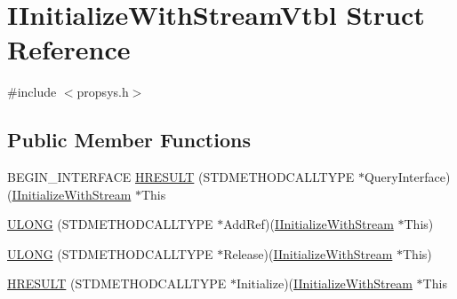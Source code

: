 \hypertarget{struct_i_initialize_with_stream_vtbl}{}\section{I\+Initialize\+With\+Stream\+Vtbl Struct Reference}
\label{struct_i_initialize_with_stream_vtbl}


{\ttfamily \#include $<$propsys.\+h$>$}

\subsection*{Public Member Functions}
\begin{DoxyCompactItemize}
\item 
B\+E\+G\+I\+N\+\_\+\+I\+N\+T\+E\+R\+F\+A\+CE \hyperlink{struct_i_initialize_with_stream_vtbl_afa1b5c7a34b7a6cb92bd225a3a9c5fe3}{H\+R\+E\+S\+U\+LT} (S\+T\+D\+M\+E\+T\+H\+O\+D\+C\+A\+L\+L\+T\+Y\+PE $\ast$Query\+Interface)(\hyperlink{propsys_8h_aa1202ac12c835e0b8b05d525e38b509e}{I\+Initialize\+With\+Stream} $\ast$This
\item 
\hyperlink{struct_i_initialize_with_stream_vtbl_a63333adfdb02b4011967942899cc5d77}{U\+L\+O\+NG} (S\+T\+D\+M\+E\+T\+H\+O\+D\+C\+A\+L\+L\+T\+Y\+PE $\ast$Add\+Ref)(\hyperlink{propsys_8h_aa1202ac12c835e0b8b05d525e38b509e}{I\+Initialize\+With\+Stream} $\ast$This)
\item 
\hyperlink{struct_i_initialize_with_stream_vtbl_ac90760ffc0e829818e0cff96502c1e6e}{U\+L\+O\+NG} (S\+T\+D\+M\+E\+T\+H\+O\+D\+C\+A\+L\+L\+T\+Y\+PE $\ast$Release)(\hyperlink{propsys_8h_aa1202ac12c835e0b8b05d525e38b509e}{I\+Initialize\+With\+Stream} $\ast$This)
\item 
\hyperlink{struct_i_initialize_with_stream_vtbl_af7e9da25d8ed3841d24a4c4787366194}{H\+R\+E\+S\+U\+LT} (S\+T\+D\+M\+E\+T\+H\+O\+D\+C\+A\+L\+L\+T\+Y\+PE $\ast$Initialize)(\hyperlink{propsys_8h_aa1202ac12c835e0b8b05d525e38b509e}{I\+Initialize\+With\+Stream} $\ast$This
\end{DoxyCompactItemize}
